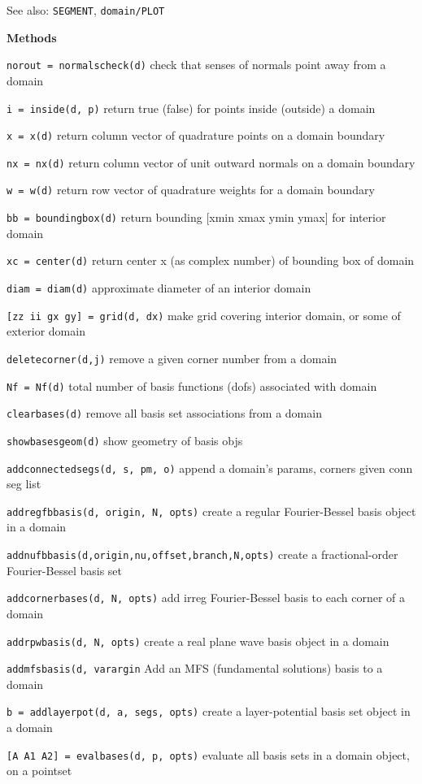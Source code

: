 See also: {\tt SEGMENT}, {\tt domain/PLOT}

\textbf{Methods}

{\tt norout = normalscheck(d)} check that senses of normals point
away from a domain

{\tt i = inside(d, p)} return true (false) for points inside
(outside) a domain

{\tt x = x(d)} return column vector of quadrature points on a domain boundary

{\tt nx = nx(d)} return column vector of unit outward normals on a
domain boundary

{\tt w = w(d)} return row vector of quadrature weights for a domain
boundary

{\tt bb = boundingbox(d)} return bounding [xmin xmax ymin ymax] for
interior domain

{\tt xc = center(d)} return center x (as complex number) of bounding
box of domain 

{\tt diam = diam(d)} approximate diameter of an interior domain

{\tt [zz ii gx gy] = grid(d, dx)} make grid covering interior
domain, or some of exterior domain

{\tt deletecorner(d,j)} remove a given corner number from a domain

{\tt Nf = Nf(d)} total number of basis functions (dofs) associated
with domain

{\tt clearbases(d)} remove all basis set associations from a domain

{\tt showbasesgeom(d)} show geometry of basis objs

{\tt addconnectedsegs(d, s, pm, o)} append a domain's params,
corners given conn seg list

{\tt addregfbbasis(d, origin, N, opts)} create a regular
Fourier-Bessel basis object in a domain

{\tt addnufbbasis(d,origin,nu,offset,branch,N,opts)} create a
fractional-order Fourier-Bessel basis set

{\tt addcornerbases(d, N, opts)} add irreg Fourier-Bessel basis to
each corner of a domain

{\tt addrpwbasis(d, N, opts)} create a real plane wave basis object
in a domain

{\tt addmfsbasis(d, varargin} Add an MFS (fundamental solutions)
basis to a domain

{\tt b = addlayerpot(d, a, segs, opts)} create a layer-potential
basis set object in a domain

{\tt [A A1 A2] = evalbases(d, p, opts)} evaluate all basis sets in
a domain object, on a pointset

